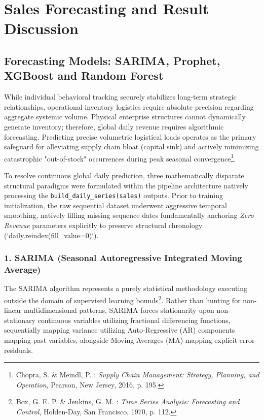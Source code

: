 \documentclass[12pt,a4paper]{report}
\begin{document}
\setcounter{chapter}{3} 
\setcounter{section}{2}

\section{Sales Forecasting and Result Discussion}

\subsection{Forecasting Models: SARIMA, Prophet, XGBoost and Random Forest}
While individual behavioral tracking securely stabilizes long-term strategic relationships, operational inventory logistics require absolute precision regarding aggregate systemic volume. Physical enterprise structures cannot dynamically generate inventory; therefore, global daily revenue requires algorithmic forecasting. Predicting precise volumetric logistical loads operates as the primary safeguard for alleviating supply chain bloat (capital sink) and actively minimizing catastrophic "out-of-stock" occurrences during peak seasonal convergence\footnote{Chopra, S. \& Meindl, P. : \textit{Supply Chain Management: Strategy, Planning, and Operation}, Pearson, New Jersey, 2016, p. 195.}. 

To resolve continuous global daily prediction, three mathematically disparate structural paradigms were formulated within the pipeline architecture natively processing the \texttt{build\_daily\_series(sales)} outputs. Prior to training initialization, the raw sequential dataset underwent aggressive temporal smoothing, natively filling missing sequence dates fundamentally anchoring \textit{Zero Revenue} parameters explicitly to preserve structural chronology (`daily.reindex(fill_value=0)`).

\subsubsection{1. SARIMA (Seasonal Autoregressive Integrated Moving Average)}
The SARIMA algorithm represents a purely statistical methodology executing outside the domain of supervised learning bounds\footnote{Box, G. E. P. \& Jenkins, G. M. : \textit{Time Series Analysis: Forecasting and Control}, Holden-Day, San Francisco, 1970, p. 112.}. Rather than hunting for non-linear multidimensional patterns, SARIMA forces stationarity upon non-stationary continuous variables utilizing fractional differencing functions, sequentially mapping variance utilizing Auto-Regressive (AR) components mapping past variables, alongside Moving Averages (MA) mapping explicit error residuals.
\end{document}
